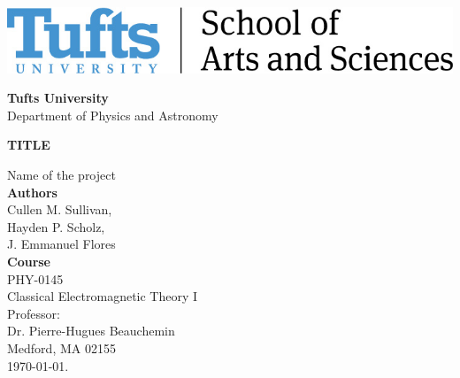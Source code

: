 \thispagestyle{empty}

\begin{center}
    \includegraphics[scale=1.5]{Figures/A&S_Hori_BK+BL.jpg}\\
    \vspace{1.0cm}
    \vspace{1.0cm}
    \begin{large}
        \textbf{Tufts University}\\
        \vspace{0.2cm}
        Department of Physics and Astronomy\\
        \vspace{1cm}
    \end{large}
    \begin{large}
        \textbf{\MakeUppercase{Title
}}\\
        \vspace{1cm}
    \end{large}
    \begin{large}
        Name of the project\\
        \vspace{1cm}
        \textbf{Authors}\\
         Cullen M. Sullivan,\\
         Hayden P. Scholz, \\
         J. Emmanuel Flores\\
        \vspace{0.5cm}
        \textbf{Course}\\
        PHY-0145 \\
        Classical Electromagnetic Theory I\\
        
        \vspace{1cm}
        Professor:\\ 
        Dr. Pierre-Hugues Beauchemin\\ 
        \vspace{1.0cm}
        Medford, MA 02155\\
        \today. %
    \end{large}
\end{center}
